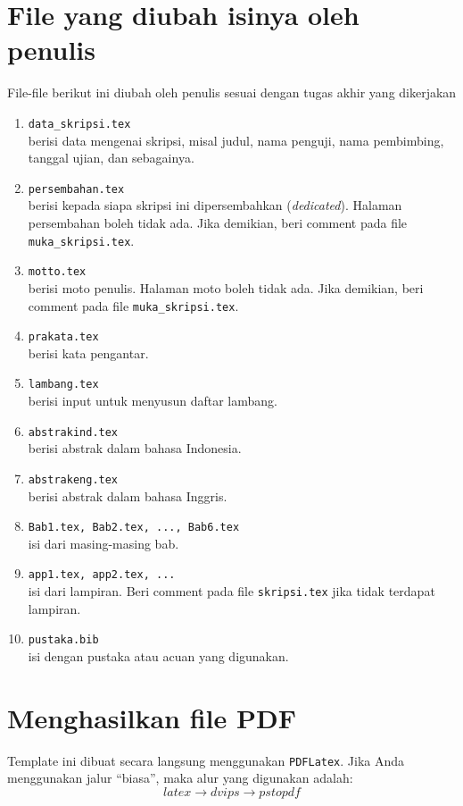 \section{File yang diubah isinya oleh penulis}
File-file berikut ini diubah oleh penulis sesuai dengan tugas akhir yang dikerjakan
\begin{enumerate}
    \item \texttt{data\_skripsi.tex} \\ berisi data mengenai skripsi, misal judul, nama penguji, nama pembimbing, tanggal ujian, dan sebagainya.
    \item \texttt{persembahan.tex} \\ berisi kepada siapa skripsi ini dipersembahkan (\textit{dedicated}). Halaman persembahan boleh tidak ada. Jika demikian, beri comment pada file \texttt{muka\_skripsi.tex}.
    \item \texttt{motto.tex} \\ berisi moto penulis. Halaman moto boleh tidak ada.  Jika demikian, beri comment pada file \texttt{muka\_skripsi.tex}.
    \item \texttt{prakata.tex} \\ berisi kata pengantar.
    \item \texttt{lambang.tex} \\ berisi input untuk menyusun daftar lambang.
    \item \texttt{abstrakind.tex} \\ berisi abstrak dalam bahasa Indonesia.
    \item \texttt{abstrakeng.tex} \\ berisi abstrak dalam bahasa Inggris.
    \item \texttt{Bab1.tex, Bab2.tex, ..., Bab6.tex} \\ isi dari masing-masing bab.
    \item \texttt{app1.tex, app2.tex, ...} \\ isi dari lampiran. Beri comment pada file \texttt{skripsi.tex} jika tidak terdapat lampiran.
    \item \texttt{pustaka.bib} \\ isi dengan pustaka atau acuan yang digunakan.
\end{enumerate}


\section{Menghasilkan file PDF}
Template ini dibuat secara langsung menggunakan \texttt{PDFLatex}. Jika Anda menggunakan jalur ``biasa'', maka alur yang digunakan adalah:
\begin{equation*}
    latex \longrightarrow dvips \longrightarrow pstopdf
\end{equation*}


